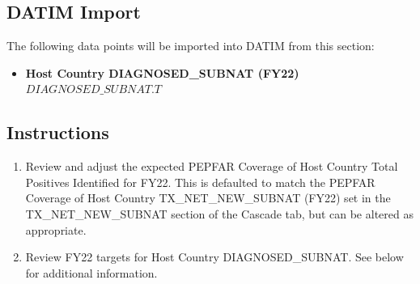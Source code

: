 \documentclass[
  openany]{book}
\providecommand{\tightlist}{%
  \setlength{\itemsep}{0pt}\setlength{\parskip}{0pt}}
\begin{document}
\begin{table}
\centering\begingroup\fontsize{12}{14}\selectfont

\endgroup{}
\end{table}

\hypertarget{datim-import-12}{%
\subsection{DATIM Import}\label{datim-import-12}}

The following data points will be imported into DATIM from this section:

\begin{itemize}
\tightlist
\item
  \textbf{Host Country DIAGNOSED\_SUBNAT (FY22)} \(DIAGNOSED\_SUBNAT.T\)
\end{itemize}

\hypertarget{instructions-12}{%
\subsection{Instructions}\label{instructions-12}}

\begin{enumerate}
\def\labelenumi{\arabic{enumi}.}
\item
  Review and adjust the expected PEPFAR Coverage of Host Country Total
  Positives Identified for FY22. This is defaulted to match the PEPFAR
  Coverage of Host Country TX\_NET\_NEW\_SUBNAT (FY22) set in the
  TX\_NET\_NEW\_SUBNAT section of the Cascade tab, but can be altered as
  appropriate.
\item
  Review FY22 targets for Host Country DIAGNOSED\_SUBNAT. See below for
  additional information.
\end{enumerate}
\end{document}
